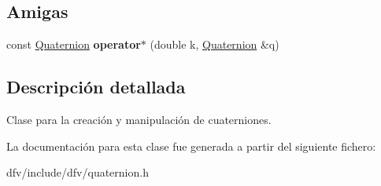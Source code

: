 \subsection*{\-Amigas}
\begin{DoxyCompactItemize}
\item 
\hypertarget{classdfv_1_1Quaternion_ab03e5e86f69c9470e9e5bc0d858e632e}{const \hyperlink{classdfv_1_1Quaternion}{\-Quaternion} {\bfseries operator$\ast$} (double k, \hyperlink{classdfv_1_1Quaternion}{\-Quaternion} \&q)}\label{classdfv_1_1Quaternion_ab03e5e86f69c9470e9e5bc0d858e632e}

\end{DoxyCompactItemize}


\subsection{\-Descripción detallada}
\-Clase para la creación y manipulación de cuaterniones. 

\-La documentación para esta clase fue generada a partir del siguiente fichero\-:\begin{DoxyCompactItemize}
\item 
dfv/include/dfv/quaternion.\-h\end{DoxyCompactItemize}
